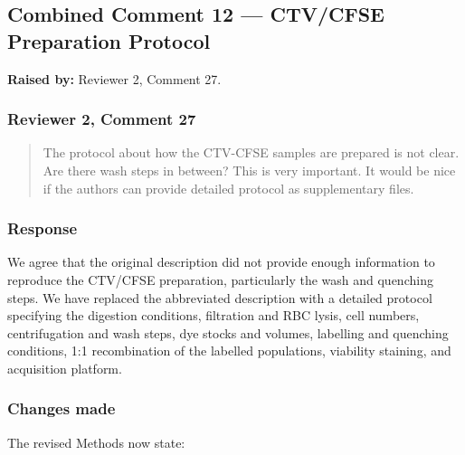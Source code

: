 \documentclass[
  11pt,
  a4paper,
]{article}
\begin{document}
\subsection{Combined Comment 12 --- CTV/CFSE Preparation
Protocol}\label{combined-comment-12--ctvcfse-preparation-protocol}

\textbf{Raised by:} Reviewer 2, Comment 27.

\subsubsection{Reviewer 2, Comment 27}\label{reviewer-2-comment-27}

\begin{quote}
The protocol about how the CTV-CFSE samples are prepared is not clear.
Are there wash steps in between? This is very important. It would be
nice if the authors can provide detailed protocol as supplementary
files.
\end{quote}

\subsubsection{Response}\label{response-11}

We agree that the original description did not provide enough
information to reproduce the CTV/CFSE preparation, particularly the wash
and quenching steps. We have replaced the abbreviated description with a
detailed protocol specifying the digestion conditions, filtration and
RBC lysis, cell numbers, centrifugation and wash steps, dye stocks and
volumes, labelling and quenching conditions, 1:1 recombination of the
labelled populations, viability staining, and acquisition platform.

\subsubsection{Changes made}\label{changes-made-11}

The revised Methods now state:
\end{document}
